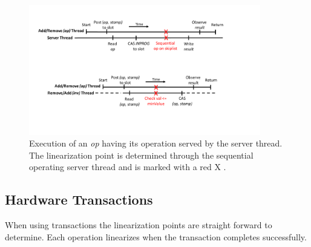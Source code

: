 \begin{figure}[htb]
	\centering
	\includegraphics[width=0.9\textwidth]{graphics/correctness1.pdf}
	\caption{Execution of an \emph{op} having its operation served by the server thread. The linearization point is determined through the sequential operating server thread and is marked with a red X \cite{calciu_adaptive_2014}.}
	\label{fig:correctness_server}
\end{figure}

\subsection{Hardware Transactions}

When using transactions the linearization points are straight forward to determine. Each operation linearizes when the transaction completes successfully. 
